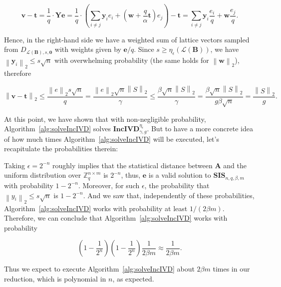 \documentclass[a4paper,11pt]{article}
\let\vec\mathbf %
\newcommand\Zqnm{{\mathbb Z}_q^{n\times m}}
\newcommand\A{{\mathbf A}}
\newcommand\LB{\mathcal{L}\left(\vec B\right)}
\newcommand\DLs[1]{D_{\LB, s, #1}}
\newcommand\smooth{\eta_\epsilon}
\newcommand\SIS{\textbf{SIS}_{n, q, \beta, m}}
\newcommand\incIVD{\textbf{IncIVD}_{\gamma, g}^{\smooth}}
\newcommand{\norm}[1]{\left\lVert #1 \right\rVert_2}
\theoremstyle{definition}
\theoremstyle{remark}
\begin{document}
$$\vec v - \vec t =  \frac{1}{q} \cdot \vec Y \vec e = \frac{1}{q} \cdot \left( 
\sum_{i\not=j}\vec y_ie_i + \left(\vec{w} + \frac{q}{\alpha}\vec t\right) e_j 
\right) - \vec t = \sum_{i\not=j}\vec y_i\frac{e_i}{q} + \vec{w}\frac{e_j}{q}.$$

Hence, in the right-hand side we have a weighted sum of lattice vectors sampled 
from $\DLs{\vec 0}$ with weights given by $\vec e / q$. Since $s \ge 
\smooth(\LB)$, we have $\norm{\vec y_i} \le s\sqrt{n}$ with overwhelming 
probability (the same holds for $\norm{\vec w}$), therefore

$$\norm{\vec v - \vec t} \le \frac{\norm{e}s\sqrt{n}}{q} =  
\frac{\norm{e}\sqrt{n}\norm{S}}{\gamma} \le \frac{\beta\sqrt{n}\norm{S}}{ 
\gamma} = \frac{\beta\sqrt{n}\norm{S}}{g \beta \sqrt{n}} = \frac{\norm{S}}{g}.$$

At this point, we have shown that with non-negligible probability, 
Algorithm~\ref{alg:solveIncIVD} solves $\incIVD$. But to have a more concrete 
idea of how much times Algorithm~\ref{alg:solveIncIVD} will be executed, let's 
recapitulate the probabilities therein:

Taking $\epsilon = 2^{-n}$ roughly implies that the statistical distance 
between $\A$ and the uniform distribution over $\Zqnm$ is $2^{-n}$, thus, $\vec 
e$ is a valid solution to $\SIS$ with probability $1 - 2^{-n}$. Moreover, for 
such $\epsilon$, the probability that $\norm{y_i} \le s\sqrt{n}$ is $1-2^{-n}$. 
And we saw that, independently of these probabilities, 
Algorithm~\ref{alg:solveIncIVD} works with probability at least $1/(2\beta m)$. 
Therefore, we can conclude that Algorithm~\ref{alg:solveIncIVD} works with 
probability

$$\left(1-\frac{1}{2^n}\right)\left(1-\frac{1}{2^n}\right)\frac{1}{2\beta m} 
\approx \frac{1}{2\beta m}.$$

Thus we expect to execute Algorithm~\ref{alg:solveIncIVD} about $2\beta m$ 
times in our reduction, which is polynomial in $n$, as expected.




\end{document}
